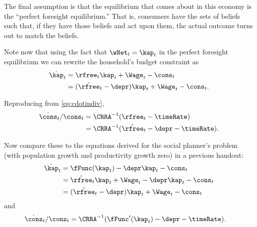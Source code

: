 \documentclass{handout}
\begin{document}
The final assumption is that the equilibrium that comes about in this 
economy is the ``perfect foresight equilibrium.''  That is, consumers 
have the sets of beliefs such that, if they have those beliefs and act 
upon them, the actual outcome turns out to match the beliefs.  

Note now that using the fact that $\wNet_{t}=\kap_{t}$ in the perfect foresight
equilibrium we can rewrite the household's budget constraint as
\begin{equation}\begin{gathered}\begin{aligned}
        \dot{\kap}_{t} & =  \rfree_{t}\kap_{t} + \Wage_{t} - \cons_{t} %
\\  & =  (\hat{\rfree}_{t}-\depr)\kap_{t} + \Wage_{t} - \cons_{t} \label{eq:kdotind}
.
\end{aligned}\end{gathered}\end{equation}

Reproducing from \eqref{eq:cdotindiv},
\begin{equation}\begin{gathered}\begin{aligned}
        \dot{\cons}_{t}/\cons_{t} & =  \CRRA^{-1}(\rfree_{t}-\timeRate) %
\\  & =  \CRRA^{-1}(\hat{\rfree}_{t}-\depr-\timeRate)   \label{eq:cdotind}.
\end{aligned}\end{gathered}\end{equation}

Now compare these to the equations derived for the social planner's 
problem (with population growth and productivity growth zero) in a 
previous handout:
\begin{equation}\begin{gathered}\begin{aligned}
        \dot{\kap}_{t} & =  \fFunc(\kap_{t})-\depr \kap_{t}-\cons_{t}  \\
         & =  \hat{\rfree}_{t}\kap_{t}+\Wage_{t}-\depr \kap_{t}-\cons_{t}  \\
         & =  (\hat{\rfree}_{t}-\depr) \kap_{t}+\Wage_{t}-\cons_{t} \label{eq:kdotsp}
\end{aligned}\end{gathered}\end{equation}
and
\begin{equation}\begin{gathered}\begin{aligned}
        \dot{\cons}_{t}/\cons_{t} & =  \CRRA^{-1}(\fFunc^{\prime}(\kap_{t})-\depr-\timeRate). \label{eq:cdotsp}
\end{aligned}\end{gathered}\end{equation}
\end{document}
